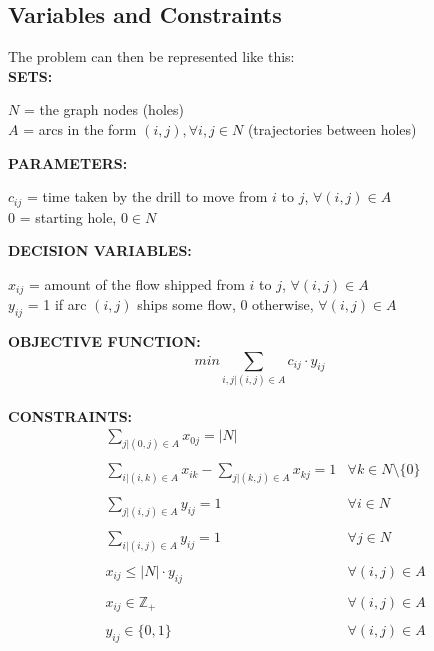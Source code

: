 	\subsection{Variables and Constraints}
		The problem can then be represented like this:\\
		\newline
		\textbf{SETS:}\\
		\begin{addmargin}[2em]{0em}
			$N$ = the graph nodes (holes)\\
			$A$ = arcs in the form $(i, j), ∀ i, j ∈ N$ (trajectories between holes)\\
		\end{addmargin}
		\textbf{PARAMETERS:}\\
		\begin{addmargin}[2em]{0em}
			$c_{ij}$ = time taken by the drill to move from $i$ to $j$, $∀ (i, j) ∈ A$\\
			$0$ = starting hole, $0 ∈ N$\\
		\end{addmargin}
		\textbf{DECISION VARIABLES:}\\
		\begin{addmargin}[2em]{0em}
			$x_{ij}$ = amount of the flow shipped from $i$ to $j$, $∀ (i, j) ∈ A$\\
			$y_{ij}$ = 1 if arc $(i, j)$ ships some flow, 0 otherwise, $∀ (i, j) ∈ A$\\
		\end{addmargin}
		\textbf{OBJECTIVE FUNCTION:}\\
		\[min \sum_{i, j | (i, j) ∈ A} c_{ij} \cdot y_{ij}\]\\
		\textbf{CONSTRAINTS:}
		\begin{align*}
			&\sum_{j | (0,j) ∈ A} x_{0j} = |N|\\
			\\
			&\sum_{i | (i, k) ∈ A} x_{ik} - \sum_{j | (k, j) ∈ A} x_{kj} = 1 & ∀ k ∈ N \setminus \{0\}\\
			\\
			&\sum_{j | (i, j) ∈ A} y_{ij} = 1 & ∀ i ∈ N\\
			\\
			&\sum_{i | (i, j) ∈ A} y_{ij} = 1 & ∀ j ∈ N\\
			\\
			&x_{ij} \leq |N| \cdot y_{ij} & ∀ (i, j) ∈ A\\
			\\
			&x_{ij} ∈ \mathbb{Z}_{+} & ∀ (i, j) ∈ A\\
			\\
			&y_{ij} ∈ \{0, 1\} & ∀ (i, j) ∈ A\\
		\end{align*}

		
		